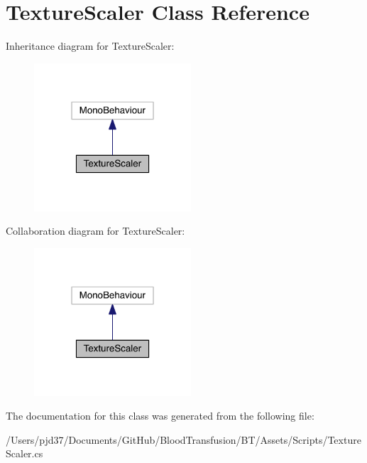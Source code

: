 \hypertarget{class_texture_scaler}{}\section{Texture\+Scaler Class Reference}
\label{class_texture_scaler}


Inheritance diagram for Texture\+Scaler\+:\nopagebreak
\begin{figure}[H]
\begin{center}
\leavevmode
\includegraphics[width=166pt]{class_texture_scaler__inherit__graph}
\end{center}
\end{figure}


Collaboration diagram for Texture\+Scaler\+:\nopagebreak
\begin{figure}[H]
\begin{center}
\leavevmode
\includegraphics[width=166pt]{class_texture_scaler__coll__graph}
\end{center}
\end{figure}


The documentation for this class was generated from the following file\+:\begin{DoxyCompactItemize}
\item 
/\+Users/pjd37/\+Documents/\+Git\+Hub/\+Blood\+Transfusion/\+B\+T/\+Assets/\+Scripts/Texture\+Scaler.\+cs\end{DoxyCompactItemize}
